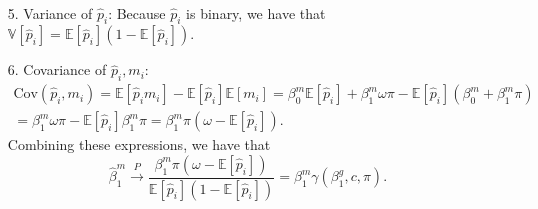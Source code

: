 \documentclass[12pt]{article}
\begin{document}
\begin{appendices}
\begin{refsection}
\begin{itemize}
\begin{multline*}
			\end{multline*}
			\item[5.] Variance of $\hat{p}_i$: Because $\hat{p}_i$ is binary, we have that $\mathbb{V}[\hat{p}_i] = \mathbb{E}[\hat{p}_i]\left(1 - \mathbb{E}[\hat{p}_i]\right) .$
			\item[6.] Covariance of $\hat{p}_i, m_i$:
			\begin{multline*}
			\textrm{Cov}\left(\hat{p}_i, m_i\right) = \mathbb{E}\left[\hat{p}_i m_i\right] - \mathbb{E}[\hat{p}_i] \mathbb{E}[m_i] = \beta^m_0 \mathbb{E}[\hat{p}_i] + \beta^m_1 \omega \pi - \mathbb{E}[\hat{p}_i]( \beta^m_0 + \beta^m_1 \pi)\\ = \beta^m_1 \omega \pi - \mathbb{E}[\hat{p}_i] \beta_1^m \pi = \beta^m_1 \pi \left( \omega - \mathbb{E}[\hat{p}_i]\right).
			\end{multline*}
			Combining these expressions, we have that
			$$ \hat{\beta}^m_1 \xrightarrow{P} \frac{\beta^m_1 \pi (\omega - \mathbb{E}[\hat{p}_i])}{\mathbb{E}[\hat{p}_i](1 - \mathbb{E}[\hat{p}_i])} = \beta^m_1 \gamma(\beta^g_1, c, \pi).$$
		\end{itemize}
		

\end{refsection}
\end{appendices}
\end{document}
